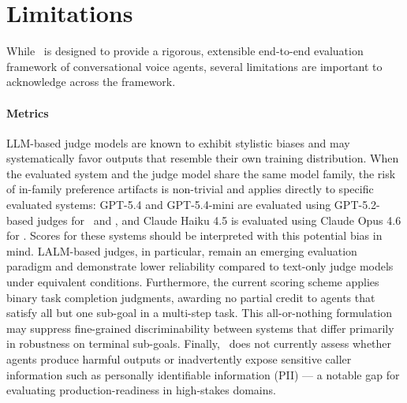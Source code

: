 \section*{Limitations}
\label{sec:limitation}
While \framework~is designed to provide a rigorous, extensible end-to-end evaluation framework of conversational voice agents, several limitations are important to acknowledge across the framework.

\paragraph{Metrics}
LLM-based judge models are known to exhibit stylistic biases and may systematically favor outputs that resemble their own training distribution. When the evaluated system and the judge model share the same model family, the risk of in-family preference artifacts is non-trivial and applies directly to specific evaluated systems: GPT-5.4 and GPT-5.4-mini are evaluated using GPT-5.2-based judges for \metricconcise~and \metricconversationprogression, and Claude Haiku 4.5 is evaluated using Claude Opus 4.6 for \metricfaithfulness. Scores for these systems should be interpreted with this potential bias in mind.
LALM-based judges, in particular, remain an emerging evaluation paradigm and demonstrate lower reliability compared to text-only judge models under equivalent conditions. Furthermore, the current scoring scheme applies binary task completion judgments, awarding no partial credit to agents that satisfy all but one sub-goal in a multi-step task. This all-or-nothing formulation may suppress fine-grained discriminability between systems that differ primarily in robustness on terminal sub-goals.
Finally, \framework~does not currently assess whether agents produce harmful outputs or inadvertently expose sensitive caller information such as personally identifiable information (PII) — a notable gap for evaluating production-readiness in high-stakes domains.

